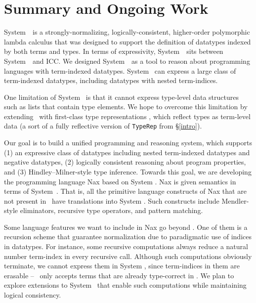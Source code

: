 \section{Summary and Ongoing Work} \label{sec:concl}
System~\Fi\ is a strongly-normalizing, logically-consistent, higher-order
polymorphic lambda calculus that was designed to support the
definition of datatypes indexed by both terms and types.
In terms of expressivity, System~\Fi\ sits between System~\Fw\ and ICC.
We designed System~\Fi\ as a tool to reason about programming
languages with term-indexed datatypes. System \Fi\ can express
a large class of term-indexed datatypes, including datatypes
with nested term-indices.

One limitation of System \Fi\ is that it cannot express type-level
data structures such as lists that contain type elements.
We hope to overcome this limitation by extending \Fi\ 
with first-class type representations \cite{DagMcb12}, which reflect
types as term-level data (a sort of a fully reflective version of
{\small\tt TypeRep} from \S\ref{intro}).

Our goal is to build a unified programming and reasoning system,
which supports
(1) an expressive class of datatypes including nested term-indexed datatypes
and negative datatypes,
(2) logically consistent reasoning about program properties, and
(3) Hindley--Milner-style type inference.
Towards this goal, we are developing the programming language
Nax based on System \Fi.
Nax is given semantics in terms of System~\Fi.
That is, all the primitive language constructs of Nax that are not present
in \Fi\ have translations into System \Fi. Such constructs include
Mendler-style eliminators, recursive type operators, and
pattern matching.

Some language features we want to include in Nax go beyond \Fi.
One of them is a recursion scheme that guarantee normalization
due to paradigmatic use of indices in datatypes. For instance,
some recursive computations always reduce a natural number term-index
in every recursive call. Although such computations obviously terminate,
we cannot express them in System \Fi, since term-indices in them are erasable
-- \Fi\ only accepts terms that are already type-correct in \Fw.
We plan to explore extensions to System \Fi\ that enable such computations
while maintaining logical consistency.

